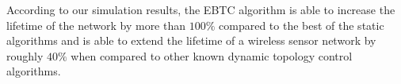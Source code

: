 \documentclass[journal,12pt,onecolumn]{IEEEtran}
\begin{document}
According to our simulation results, the EBTC algorithm is able to
increase the lifetime of the network by more than $100\%$ compared to the best
of the static algorithms and is able to extend the
lifetime of a wireless sensor network by roughly $40\%$ when compared
to other known dynamic topology control algorithms.







\end{document}
